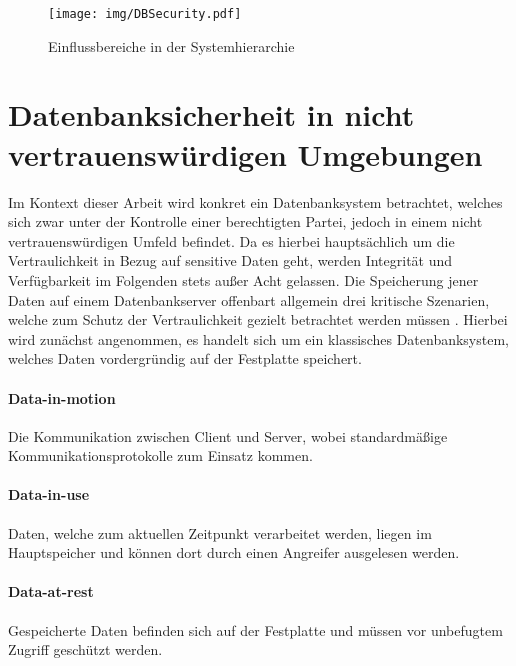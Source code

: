 \begin{figure}
	\texttt{[image: img/DBSecurity.pdf]}
	\centering
	\caption{Einflussbereiche in der Systemhierarchie}
	\label{fig:dbsecurity}
\end{figure}

\section{Datenbanksicherheit in nicht vertrauenswürdigen Umgebungen}

Im Kontext dieser Arbeit wird konkret ein Datenbanksystem betrachtet, welches sich zwar unter der Kontrolle einer berechtigten Partei, jedoch in einem nicht vertrauenswürdigen Umfeld befindet. Da es hierbei hauptsächlich um die Vertraulichkeit in Bezug auf sensitive Daten geht, werden Integrität und Verfügbarkeit im Folgenden stets außer Acht gelassen. Die Speicherung jener Daten auf einem Datenbankserver offenbart allgemein drei kritische Szenarien, welche zum Schutz der Vertraulichkeit gezielt betrachtet werden müssen \cite{Shmueli2010}. Hierbei wird zunächst angenommen, es handelt sich um ein klassisches Datenbanksystem, welches Daten vordergründig auf der Festplatte speichert.

\paragraph{Data-in-motion}
Die Kommunikation zwischen Client und Server, wobei standardmäßige Kommunikationsprotokolle zum Einsatz kommen.

\paragraph{Data-in-use}
Daten, welche zum aktuellen Zeitpunkt verarbeitet werden, liegen im Hauptspeicher und können dort durch einen Angreifer ausgelesen werden.

\paragraph{Data-at-rest}
Gespeicherte Daten befinden sich auf der Festplatte und müssen vor unbefugtem Zugriff geschützt werden.

